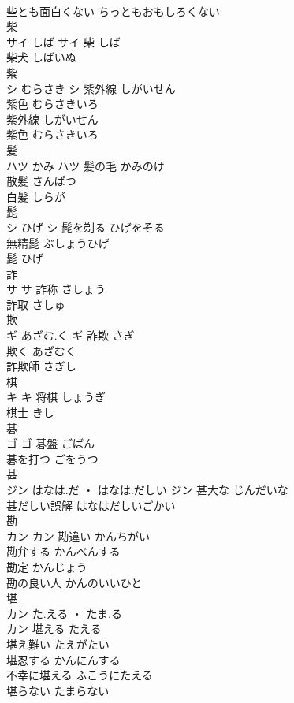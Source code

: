 \documentclass[8pt]{extreport}
\begin{document}
\begin{CJK}{UTF8}{min}
\\	些とも面白くない	ちっともおもしろくない	
\\	柴	
\\	サイ	しば	サイ													柴	しば	
\\	柴犬	しばいぬ	
\\	紫	
\\	シ	むらさき	シ	紫外線	しがいせん	
\\	紫色	むらさきいろ	
\\	紫外線	しがいせん	
\\	紫色	むらさきいろ	
\\	髪	
\\	ハツ	かみ	ハツ	髪の毛	かみのけ	
\\	散髪	さんぱつ	
\\	白髪	しらが	
\\	髭	
\\	シ	ひげ	シ	髭を剃る	ひげをそる	
\\	無精髭	ぶしょうひげ	
\\	髭	ひげ	
\\	詐	
\\	サ		サ													詐称	さしょう	
\\	詐取	さしゅ	
\\	欺	
\\	ギ	あざむ.く	ギ	詐欺	さぎ	
\\	欺く	あざむく	
\\	詐欺師	さぎし	
\\	棋	
\\	キ		キ	将棋	しょうぎ	
\\	棋士	きし	
\\	碁	
\\	ゴ		ゴ	碁盤	ごばん	
\\	碁を打つ	ごをうつ	
\\	甚	
\\	ジン	はなは.だ ・ はなは.だしい	ジン	甚大な	じんだいな	
\\	甚だしい誤解	はなはだしいごかい	
\\	勘	
\\	カン		カン	勘違い	かんちがい	
\\	勘弁する	かんべんする	
\\	勘定	かんじょう	
\\	勘の良い人	かんのいいひと	
\\	堪	
\\	カン	た.える ・ たま.る
\\	カン	堪える	たえる	
\\	堪え難い	たえがたい	
\\	堪忍する	かんにんする	
\\	不幸に堪える	ふこうにたえる	
\\	堪らない	たまらない	
\end{CJK}
\end{document}
